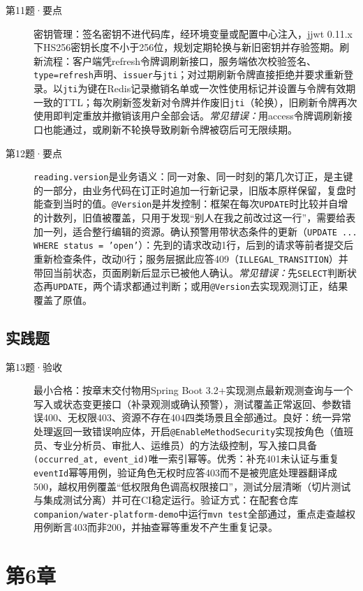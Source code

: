 \begin{description}
  \item[第11题·要点] 密钥管理：签名密钥不进代码库，经环境变量或配置中心注入，jjwt 0.11.x下HS256密钥长度不小于256位，规划定期轮换与新旧密钥并存验签期。刷新流程：客户端凭refresh令牌调刷新接口，服务端依次校验签名、\texttt{type=refresh}声明、\texttt{issuer}与\texttt{jti}；对过期刷新令牌直接拒绝并要求重新登录。以\texttt{jti}为键在Redis记录撤销名单或一次性使用标记并设置与令牌有效期一致的TTL；每次刷新签发新对令牌并作废旧\texttt{jti}（轮换），旧刷新令牌再次使用即判定重放并撤销该用户全部会话。\textit{常见错误：}用access令牌调刷新接口也能通过，或刷新不轮换导致刷新令牌被窃后可无限续期。
  \item[第12题·要点] \texttt{reading.version}是业务语义：同一对象、同一时刻的第几次订正，是主键的一部分，由业务代码在订正时追加一行新记录，旧版本原样保留，复盘时能查到当时的值。\texttt{@Version}是并发控制：框架在每次\texttt{UPDATE}时比较并自增的计数列，旧值被覆盖，只用于发现“别人在我之前改过这一行”，需要给表加一列，适合整行编辑的资源。确认预警用带状态条件的更新（\texttt{UPDATE ... WHERE status = 'open'}）：先到的请求改动1行，后到的请求等前者提交后重新检查条件，改动0行；服务层据此应答409（\texttt{ILLEGAL\_TRANSITION}）并带回当前状态，页面刷新后显示已被他人确认。\textit{常见错误：}先\texttt{SELECT}判断状态再\texttt{UPDATE}，两个请求都通过判断；或用\texttt{@Version}去实现观测订正，结果覆盖了原值。
\end{description}

\subsection*{实践题}
\begin{description}
  \item[第13题·验收] 最小合格：按章末交付物用Spring Boot 3.2+实现测点最新观测查询与一个写入或状态变更接口（补录观测或确认预警），测试覆盖正常返回、参数错误400、无权限403、资源不存在404四类场景且全部通过。良好：统一异常处理返回一致错误响应体，开启\texttt{@EnableMethodSecurity}实现按角色（值班员、专业分析员、审批人、运维员）的方法级控制，写入接口具备\texttt{(occurred\_at, event\_id)}唯一索引幂等。优秀：补充401未认证与重复\texttt{eventId}幂等用例，验证角色无权时应答403而不是被兜底处理器翻译成500，越权用例覆盖“低权限角色调高权限接口”，测试分层清晰（切片测试与集成测试分离）并可在CI稳定运行。验证方式：在配套仓库\texttt{companion/water-platform-demo}中运行\texttt{mvn test}全部通过，重点走查越权用例断言403而非200，并抽查幂等重发不产生重复记录。
\end{description}

\section{第6章}

